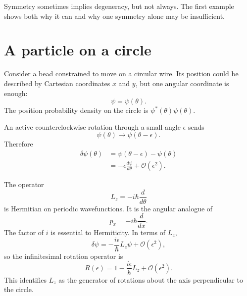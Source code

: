 Symmetry sometimes implies degeneracy, but not always. The first example shows both why it can and why one symmetry alone may be insufficient.

\section{A particle on a circle}

Consider a bead constrained to move on a circular wire. Its position could be described by Cartesian coordinates \(x\) and \(y\), but one angular coordinate is enough:
\begin{equation}
\psi=\psi(\theta).
\end{equation}
The position probability density on the circle is \(\psi^*(\theta)\psi(\theta)\).

An active counterclockwise rotation through a small angle \(\epsilon\) sends
\begin{equation}
\psi(\theta)\longrightarrow\psi(\theta-\epsilon).
\end{equation}
Therefore
\begin{align}
\delta\psi(\theta)
&=\psi(\theta-\epsilon)-\psi(\theta)\\
&=-\epsilon\frac{d\psi}{d\theta}
+\mathcal O(\epsilon^2).
\end{align}

The operator
\begin{equation}
L_z=-i\hbar\frac{d}{d\theta}
\end{equation}
is Hermitian on periodic wavefunctions. It is the angular analogue of
\begin{equation}
p_x=-i\hbar\frac{d}{dx}.
\end{equation}
The factor of \(i\) is essential to Hermiticity. In terms of \(L_z\),
\begin{equation}
\delta\psi
=-\frac{i\epsilon}{\hbar}L_z\psi
+\mathcal O(\epsilon^2),
\end{equation}
so the infinitesimal rotation operator is
\begin{equation}
R(\epsilon)
=1-\frac{i\epsilon}{\hbar}L_z
+\mathcal O(\epsilon^2).
\end{equation}
This identifies \(L_z\) as the generator of rotations about the axis perpendicular to the circle.

\begin{classroomqa}
\end{classroomqa}

